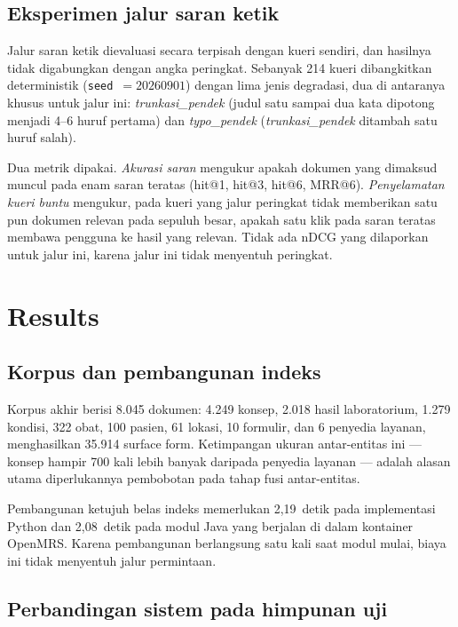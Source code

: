 \documentclass[journal,twoside,web]{ieeecolor}
\begin{document}
\subsection{Eksperimen jalur saran ketik}

Jalur saran ketik dievaluasi secara terpisah dengan kueri sendiri, dan hasilnya
tidak digabungkan dengan angka peringkat. Sebanyak 214 kueri dibangkitkan
deterministik (\texttt{seed}~$=20260901$) dengan lima jenis degradasi, dua di
antaranya khusus untuk jalur ini: \emph{trunkasi\_pendek} (judul satu sampai dua
kata dipotong menjadi 4--6 huruf pertama) dan \emph{typo\_pendek}
(\emph{trunkasi\_pendek} ditambah satu huruf salah).

Dua metrik dipakai. \emph{Akurasi saran} mengukur apakah dokumen yang dimaksud
muncul pada enam saran teratas (hit@1, hit@3, hit@6, MRR@6). \emph{Penyelamatan
kueri buntu} mengukur, pada kueri yang jalur peringkat tidak memberikan satu pun
dokumen relevan pada sepuluh besar, apakah satu klik pada saran teratas membawa
pengguna ke hasil yang relevan. Tidak ada nDCG yang dilaporkan untuk jalur ini,
karena jalur ini tidak menyentuh peringkat.

\section{Results}
\label{sec:hasil}

\subsection{Korpus dan pembangunan indeks}

Korpus akhir berisi 8.045 dokumen: 4.249 konsep, 2.018 hasil laboratorium, 1.279
kondisi, 322 obat, 100 pasien, 61 lokasi, 10 formulir, dan 6 penyedia layanan,
menghasilkan 35.914 surface form. Ketimpangan ukuran antar-entitas ini ---
konsep hampir 700 kali lebih banyak daripada penyedia layanan --- adalah alasan
utama diperlukannya pembobotan pada tahap fusi antar-entitas.

Pembangunan ketujuh belas indeks memerlukan 2,19~detik pada implementasi Python
dan 2,08~detik pada modul Java yang berjalan di dalam kontainer OpenMRS. Karena
pembangunan berlangsung satu kali saat modul mulai, biaya ini tidak menyentuh
jalur permintaan.

\subsection{Perbandingan sistem pada himpunan uji}
\end{document}
